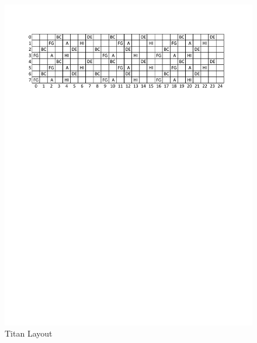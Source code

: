 \begin{figure}[t]
  \begin{center}
    \includegraphics{figures/titanplacement}
    \caption{Titan Layout}\label{fig:titanlayout}
  \end{center}
\end{figure}



